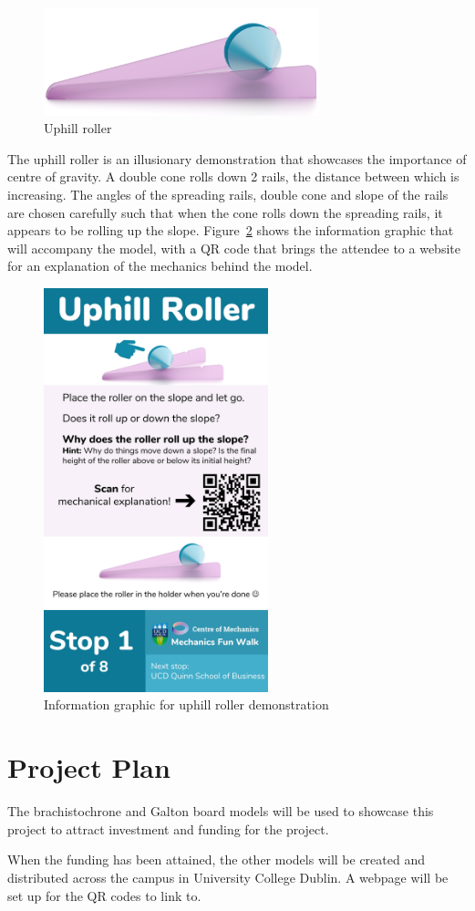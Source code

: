 \documentclass[12pt, a4paper]{article}
\begin{document}
\begin{figure}[H]
    \centering
    \includegraphics[width=8cm]{holder-pink-darker-FFFFFF.png}
    \caption{Uphill roller}
    \label{}
\end{figure}
The uphill roller is an illusionary demonstration that showcases the importance of centre of gravity. A double cone rolls down 2 rails, the distance between which is increasing. The angles of the spreading rails, double cone and slope of the rails are chosen carefully such that when the cone rolls down the spreading rails, it appears to be rolling up the slope. Figure~\ref{sticker} shows the information graphic that will accompany the model, with a QR code that brings the attendee to a website for an explanation of the mechanics behind the model.
\begin{figure}[H]
    \centering
    \includegraphics[width=6.5cm]{uphillrollersticker.jpg}
    \caption{Information graphic for uphill roller demonstration}
    \label{sticker}
\end{figure}

\section{Project Plan}
The brachistochrone and Galton board models will be used to showcase this project to attract investment and funding for the project. 

When the funding has been attained, the other models will be created and distributed across the campus in University College Dublin. A webpage will be set up for the QR codes to link to.






\newpage


\end{document}
